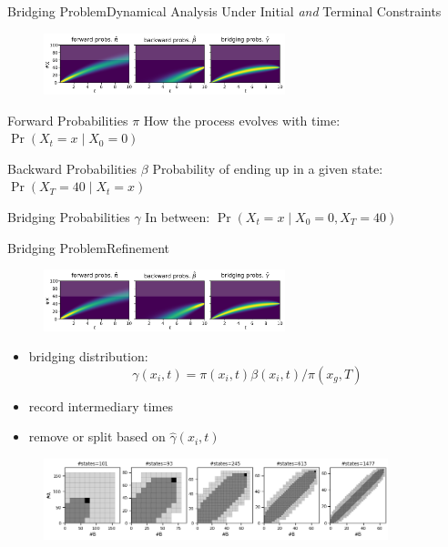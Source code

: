\documentclass[10pt]{beamer}
\newcommand{\bottomcite}[1]{\vspace*{\fill} {\scriptsize \parencite{#1}}}
\begin{document}
\begin{frame}{Bridging Problem}{Dynamical Analysis Under Initial \emph{and} Terminal Constraints}
    \begin{figure}
        \includegraphics[width=7cm]{../gfx/bridging_bd.pdf}
    \end{figure}
    \begin{block}{Forward Probabilities $\pi$}
        How the process evolves with time: $\Pr({X_t=x\mid X_0=0})$
    \end{block}
    \begin{block}{Backward Probabilities $\beta$}
        Probability of ending up in a given state: $\Pr(X_T=40 \mid X_t = x)$
    \end{block}
    \begin{block}{Bridging Probabilities $\gamma$}
        In between: $\Pr (X_t=x\mid X_0=0, X_T=40)$
    \end{block}
    \bottomcite{backenkohler2020analysis}
\end{frame}

\begin{frame}{Bridging Problem}{Refinement}
    \begin{figure}
        \includegraphics[width=7cm]{../gfx/bridging_bd.pdf}
    \end{figure}
    \begin{itemize}
        \item bridging distribution: 
            \[ 
            \gamma(x_i, t) = \pi(x_i, t)\beta(x_i, t)/\pi(x_g, T) \]
        \item record intermediary times
        \item remove or split based on $\hat{\gamma}(x_i, t)$
    \end{itemize}
    \begin{figure}
        \includegraphics[width=10cm]{../gfx/refinement.png}
    \end{figure}

    \bottomcite{backenkohler2020analysis}
\end{frame}
\end{document}
